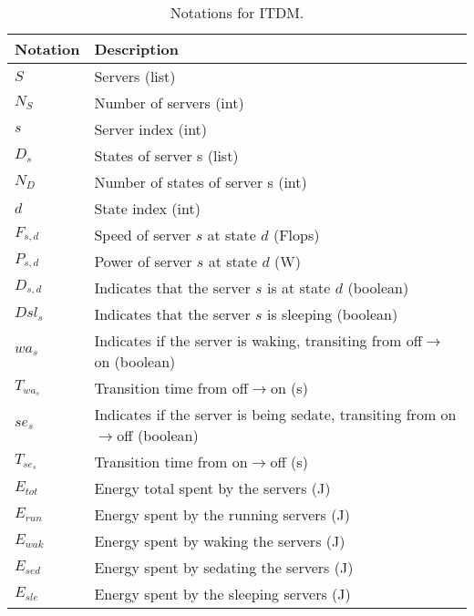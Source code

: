 \begin{table*}[!htb]
\centering
\caption{Notations for ITDM.}
\label{tab:notation_it}
\begin{tabular}{l|l}
    \hline
    Notation & Description \\\hline\hline
    $S$ & Servers (list) \\
    $N_{S}$ & Number of servers (int) \\
    $s$ & Server index (int) \\
    $D_s$ & States of server s (list) \\
    $N_{D}$ & Number of states of server s (int) \\
    $d$ & State index (int) \\
    $F_{s,d}$ & Speed of server $s$ at state $d$ (Flops)\\
    $P_{s,d}$ & Power of server $s$ at state $d$ (W)\\
    $D_{s,d}$ & Indicates that the server $s$ is at state $d$ (boolean)\\
    $Dsl_{s}$ & Indicates that the server $s$ is sleeping (boolean)\\
    $wa_s$ & Indicates if the server is waking, transiting from off$\rightarrow$on (boolean) \\
    $T_{wa_s}$ & Transition time from off$\rightarrow$on (s) \\
    $se_s$ & Indicates if the server is being sedate, transiting from on$\rightarrow$off (boolean) \\
    $T_{se_s}$ & Transition time from on$\rightarrow$off (s) \\    
    $E_{tot}$ & Energy total spent by the servers (J) \\
    $E_{run}$ & Energy spent by the running servers (J) \\
    $E_{wak}$ & Energy spent by waking the servers (J) \\
    $E_{sed}$ & Energy spent by sedating the servers (J) \\
    $E_{sle}$ & Energy spent by the sleeping servers (J) \\
    \hline
\end{tabular}
\end{table*}